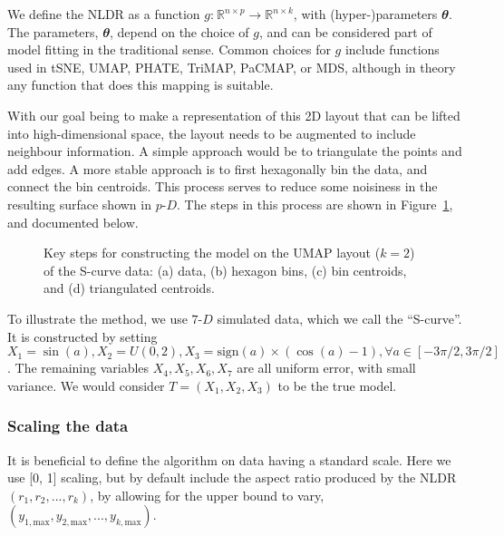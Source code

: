 \documentclass[
  12pt]{article}
\newcommand\pD{$p\text{-}D$}
\begin{document}
We define the NLDR as a function
\(g\text{:}~ \mathbb{R}^{n\times p} \rightarrow \mathbb{R}^{n\times k}\),
with (hyper-)parameters \(\mathbfit{\theta}\). The parameters,
\(\mathbfit{\theta}\), depend on the choice of \(g\), and can be
considered part of model fitting in the traditional sense. Common
choices for \(g\) include functions used in tSNE, UMAP, PHATE, TriMAP,
PaCMAP, or MDS, although in theory any function that does this mapping
is suitable.

With our goal being to make a representation of this 2D layout that can
be lifted into high-dimensional space, the layout needs to be augmented
to include neighbour information. A simple approach would be to
triangulate the points and add edges. A more stable approach is to first
hexagonally bin the data, and connect the bin centroids. This process
serves to reduce some noisiness in the resulting surface shown in \pD{}.
The steps in this process are shown in Figure~\ref{fig-NLDR-scurve}, and
documented below.

\begin{figure}


\caption{\label{fig-NLDR-scurve}Key steps for constructing the model on
the UMAP layout (\(k=2\)) of the S-curve data: (a) data, (b) hexagon
bins, (c) bin centroids, and (d) triangulated centroids.}

\end{figure}%

To illustrate the method, we use \(7\text{-}D\) simulated data, which we
call the ``S-curve''. It is constructed by setting
\(X_1 = \sin(a), X_2 = U(0, 2), X_3 = \text{sign}(a) \times (\cos(a) - 1), \forall a \in [-3\pi/2, 3\pi/2]\).
The remaining variables \(X_4, X_5, X_6, X_7\) are all uniform error,
with small variance. We would consider \(T=(X_1, X_2, X_3)\) to be the
true model.

\subsubsection{Scaling the data}\label{scaling-the-data}

It is beneficial to define the algorithm on data having a standard
scale. Here we use {[}0, 1{]} scaling, but by default include the aspect
ratio produced by the NLDR \((r_1, r_2, ..., r_k)\), by allowing for the
upper bound to vary,
\((y_{1,\text{max}}, y_{2,\text{max}}, ..., y_{k,\text{max}})\).
\end{document}
